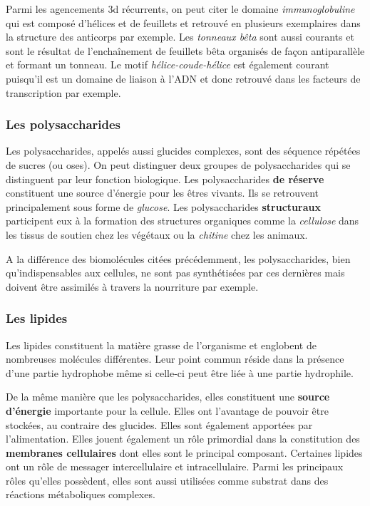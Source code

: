 Parmi les agencements 3d récurrents, on peut citer le domaine \textit{immunoglobuline} qui est composé d'hélices et de feuillets et retrouvé en plusieurs exemplaires dans la structure des anticorps par exemple. Les \textit{tonneaux bêta} sont aussi courants et sont le résultat de l’enchaînement de feuillets bêta organisés de façon antiparallèle et formant un tonneau. Le motif \textit{hélice-coude-hélice} est également courant puisqu'il est un domaine de liaison à l'ADN et donc retrouvé dans les facteurs de transcription par exemple.

\subsubsection{Les polysaccharides}

Les polysaccharides, appelés aussi glucides complexes, sont des séquence répétées de sucres (ou oses). On peut distinguer deux groupes de polysaccharides qui se distinguent par leur fonction biologique. Les polysaccharides \textbf{de réserve} constituent une source d'énergie pour les êtres vivants. Ils se retrouvent principalement sous forme de \textit{glucose}.
Les polysaccharides \textbf{structuraux} participent eux à la formation des structures organiques comme la \textit{cellulose} dans les tissus de soutien chez les végétaux ou la \textit{chitine} chez les animaux.

A la différence des biomolécules citées précédemment, les polysaccharides, bien qu'indispensables aux cellules, ne sont pas synthétisées par ces dernières mais doivent être assimilés à travers la nourriture par exemple.

\subsubsection{Les lipides}

Les lipides constituent la matière grasse de l'organisme et englobent de nombreuses molécules différentes. Leur point commun réside dans la présence d'une partie hydrophobe même si celle-ci peut être liée à une partie hydrophile.

De la même manière que les polysaccharides, elles constituent une \textbf{source d'énergie} importante pour la cellule. Elles ont l'avantage de pouvoir être stockées, au contraire des glucides. Elles sont également apportées par l'alimentation.
Elles jouent également un rôle primordial dans la constitution des \textbf{membranes cellulaires} dont elles sont le principal composant.
Certaines lipides ont un rôle de messager intercellulaire et intracellulaire.
Parmi les principaux rôles qu'elles possèdent, elles sont aussi utilisées comme substrat dans des réactions métaboliques complexes.


